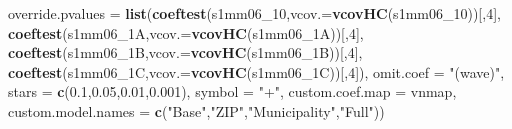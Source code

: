 \documentclass[
]{article}
\newenvironment{Shaded}{\begin{snugshade}}{\end{snugshade}}
\newcommand{\DataTypeTok}[1]{\textcolor[rgb]{0.13,0.29,0.53}{#1}}
\newcommand{\DecValTok}[1]{\textcolor[rgb]{0.00,0.00,0.81}{#1}}
\newcommand{\FloatTok}[1]{\textcolor[rgb]{0.00,0.00,0.81}{#1}}
\newcommand{\KeywordTok}[1]{\textcolor[rgb]{0.13,0.29,0.53}{\textbf{#1}}}
\newcommand{\NormalTok}[1]{#1}
\newcommand{\StringTok}[1]{\textcolor[rgb]{0.31,0.60,0.02}{#1}}
\begin{document}
\begin{Shaded}
\begin{Highlighting}[]
          \DataTypeTok{override.pvalues =} \KeywordTok{list}\NormalTok{(}\KeywordTok{coeftest}\NormalTok{(s1mm06_}\DecValTok{10}\NormalTok{,}\DataTypeTok{vcov.=}\KeywordTok{vcovHC}\NormalTok{(s1mm06_}\DecValTok{10}\NormalTok{))[,}\DecValTok{4}\NormalTok{],}
                                  \KeywordTok{coeftest}\NormalTok{(s1mm06_1A,}\DataTypeTok{vcov.=}\KeywordTok{vcovHC}\NormalTok{(s1mm06_1A))[,}\DecValTok{4}\NormalTok{],}
                                  \KeywordTok{coeftest}\NormalTok{(s1mm06_1B,}\DataTypeTok{vcov.=}\KeywordTok{vcovHC}\NormalTok{(s1mm06_1B))[,}\DecValTok{4}\NormalTok{],}
                                  \KeywordTok{coeftest}\NormalTok{(s1mm06_1C,}\DataTypeTok{vcov.=}\KeywordTok{vcovHC}\NormalTok{(s1mm06_1C))[,}\DecValTok{4}\NormalTok{]),}
          \DataTypeTok{omit.coef =} \StringTok{"(wave)"}\NormalTok{, }\DataTypeTok{stars =} \KeywordTok{c}\NormalTok{(}\FloatTok{0.1}\NormalTok{,}\FloatTok{0.05}\NormalTok{,}\FloatTok{0.01}\NormalTok{,}\FloatTok{0.001}\NormalTok{), }\DataTypeTok{symbol =} \StringTok{"+"}\NormalTok{,}
          \DataTypeTok{custom.coef.map =}\NormalTok{ vnmap, }
          \DataTypeTok{custom.model.names =} \KeywordTok{c}\NormalTok{(}\StringTok{"Base"}\NormalTok{,}\StringTok{"ZIP"}\NormalTok{,}\StringTok{"Municipality"}\NormalTok{,}\StringTok{"Full"}\NormalTok{))}
\end{Highlighting}
\end{Shaded}
\end{document}
